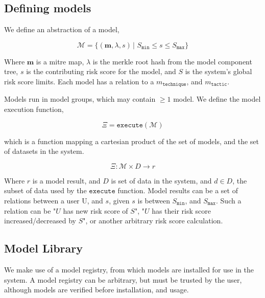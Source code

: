 \documentclass[10pt, titlepage, twocolumn]{article}
\begin{document}
\subsection{Defining models}
We define an abstraction of a model, 

\begin{equation}
\boldsymbol{\mathcal{M}} = \{(\boldsymbol{m}, \lambda, s) \, \vert \,\,S_{ \texttt{min} } \leq s \leq S_{ \texttt{max} }  \}
\end{equation}

Where \(\boldsymbol{m}\) is a mitre map, \(\lambda\) is the merkle root hash from the model component tree, \(s\) is the contributing risk score for the model, and \(S\) is the system's global risk score limits. Each model has a relation to a \(m_{\texttt{technique}}\), and \(m_{\texttt{tactic}}\). 


Models run in model groups, which may contain \(\geq 1\) model. We define the model execution function, 

\begin{equation}
\Xi = \texttt{execute}( \boldsymbol{\mathcal{M}} )
\end{equation}

which is a function mapping a cartesian product of the set of models, and the set of datasets in the system.

\begin{equation}
\Xi  :  \boldsymbol{\mathcal{M}} \times D \rightarrow r
\end{equation}

Where \(r\) is a model result, and \(D\) is set of data in the system, and \(d \in D\), the subset of data used by the \(\texttt{execute}\) function. Model results can be a set of relations between a user U, and \(s\), given \(s\) is between \(S_{ \texttt{min} }\), and \(S_{ \texttt{max} }\). Such a relation can be "\(U\) has new risk score of \(S\)", "\(U\) has their risk score increased/decreased by \(S\)", or another arbitrary risk score calculation. 





\subsection{Model Library}
We make use of a model registry, from which models are installed for use in the system. A model registry can be arbitrary, but must be trusted by the user, although models are verified before installation, and usage. 
\end{document}
